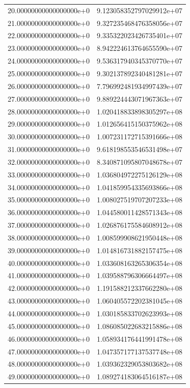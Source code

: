 \begin{table}
\begin{tabular}{S S}
    20.00000000000000000e+0 & 9.123058352797029912e+07\\
    21.00000000000000000e+0 & 9.327235468476358056e+07\\
    22.00000000000000000e+0 & 9.335322023426735401e+07\\
    23.00000000000000000e+0 & 8.942224613764655590e+07\\
    24.00000000000000000e+0 & 9.536317940345370770e+07\\
    25.00000000000000000e+0 & 9.302137892340481281e+07\\
    26.00000000000000000e+0 & 7.796992481934997439e+07\\
    27.00000000000000000e+0 & 9.889224443071967363e+07\\
    28.00000000000000000e+0 & 1.020418833898305297e+08\\
    29.00000000000000000e+0 & 1.012656415150375962e+08\\
    30.00000000000000000e+0 & 1.007231172715391666e+08\\
    31.00000000000000000e+0 & 9.618198553546531498e+07\\
    32.00000000000000000e+0 & 8.340871095807048678e+07\\
    33.00000000000000000e+0 & 1.036804972275126129e+08\\
    34.00000000000000000e+0 & 1.041859954335693866e+08\\
    35.00000000000000000e+0 & 1.008027519707207233e+08\\
    36.00000000000000000e+0 & 1.044580011428571343e+08\\
    37.00000000000000000e+0 & 1.026876175584608912e+08\\
    38.00000000000000000e+0 & 1.008599908621950448e+08\\
    39.00000000000000000e+0 & 1.014816731882157475e+08\\
    40.00000000000000000e+0 & 1.033608163265306354e+08\\
    41.00000000000000000e+0 & 1.039588796306664497e+08\\
    42.00000000000000000e+0 & 1.191588212337662280e+08\\
    43.00000000000000000e+0 & 1.060405572202381045e+08\\
    44.00000000000000000e+0 & 1.030185833702623993e+08\\
    45.00000000000000000e+0 & 1.086085022683215886e+08\\
    46.00000000000000000e+0 & 1.058934176441991478e+08\\
    47.00000000000000000e+0 & 1.047357177137537748e+08\\
    48.00000000000000000e+0 & 1.039362329053803682e+08\\
    49.00000000000000000e+0 & 1.089274183064516187e+08\\

    \bottomrule
  \end{tabular}
\end{table}

